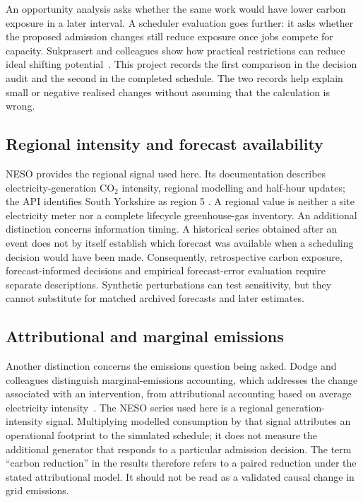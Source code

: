 An opportunity analysis asks whether the same work would have lower carbon exposure in a later interval. A scheduler evaluation goes further: it asks whether the proposed admission changes still reduce exposure once jobs compete for capacity. Sukprasert and colleagues show how practical restrictions can reduce ideal shifting potential~\citep{sukprasert2024limitations}. This project records the first comparison in the decision audit and the second in the completed schedule. The two records help explain small or negative realised changes without assuming that the calculation is wrong.

\subsection{Regional intensity and forecast availability}
NESO provides the regional signal used here. Its documentation describes electricity-generation CO$_2$ intensity, regional modelling and half-hour updates; the API identifies South Yorkshire as region 5 \citep{nesoCarbonIntensity,nesoAPI}. A regional value is neither a site electricity meter nor a complete lifecycle greenhouse-gas inventory. An additional distinction concerns information timing. A historical series obtained after an event does not by itself establish which forecast was available when a scheduling decision would have been made. Consequently, retrospective carbon exposure, forecast-informed decisions and empirical forecast-error evaluation require separate descriptions. Synthetic perturbations can test sensitivity, but they cannot substitute for matched archived forecasts and later estimates.

\subsection{Attributional and marginal emissions}
Another distinction concerns the emissions question being asked. Dodge and colleagues distinguish marginal-emissions accounting, which addresses the change associated with an intervention, from attributional accounting based on average electricity intensity~\citep{dodge2022carbon}. The NESO series used here is a regional generation-intensity signal. Multiplying modelled consumption by that signal attributes an operational footprint to the simulated schedule; it does not measure the additional generator that responds to a particular admission decision. The term ``carbon reduction'' in the results therefore refers to a paired reduction under the stated attributional model. It should not be read as a validated causal change in grid emissions.

